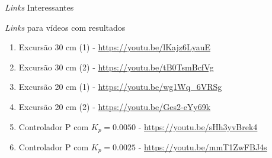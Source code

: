 \documentclass[10pt]{beamer}
\begin{document}
\begin{frame}[fragile]{\textit{Links} Interessantes}
\begin{block}{\textit{Links} para vídeos com resultados}
\begin{enumerate}
	\item Excursão 30 cm (1) - \url{https://youtu.be/lKajz6LyauE}
	\item Excursão 30 cm (2) - \url{https://youtu.be/tB0TsmBcfVg}
	\item Excursão 20 cm (1) - \url{https://youtu.be/wg1Wq_6VRSg}
	\item Excursão 20 cm (2) - \url{https://youtu.be/Ges2-eYy69k}
	\item Controlador P com $K_p = 0.0050$ - \url{https://youtu.be/sHh3yvBrek4} 
	\item Controlador P com $K_p = 0.0025$ - \url{https://youtu.be/mmT1ZwFBJ4s}
\end{enumerate}
\end{block}
\end{frame}
%
%
%
\end{document}
